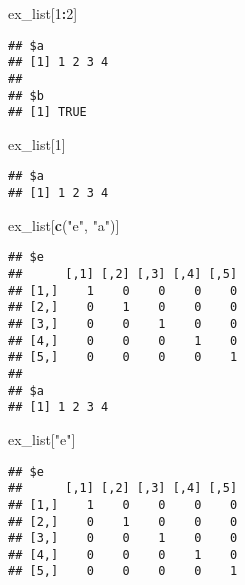 \documentclass[]{book}
\newenvironment{Shaded}{\begin{snugshade}}{\end{snugshade}}
\newcommand{\DecValTok}[1]{\textcolor[rgb]{0.00,0.00,0.81}{#1}}
\newcommand{\KeywordTok}[1]{\textcolor[rgb]{0.13,0.29,0.53}{\textbf{#1}}}
\newcommand{\NormalTok}[1]{#1}
\newcommand{\OperatorTok}[1]{\textcolor[rgb]{0.81,0.36,0.00}{\textbf{#1}}}
\newcommand{\StringTok}[1]{\textcolor[rgb]{0.31,0.60,0.02}{#1}}
\begin{document}
\begin{Shaded}
\begin{Highlighting}[]
\NormalTok{ex_list[}\DecValTok{1}\OperatorTok{:}\DecValTok{2}\NormalTok{]}
\end{Highlighting}
\end{Shaded}

\begin{verbatim}
## $a
## [1] 1 2 3 4
## 
## $b
## [1] TRUE
\end{verbatim}

\begin{Shaded}
\begin{Highlighting}[]
\NormalTok{ex_list[}\DecValTok{1}\NormalTok{]}
\end{Highlighting}
\end{Shaded}

\begin{verbatim}
## $a
## [1] 1 2 3 4
\end{verbatim}

\begin{Shaded}
\begin{Highlighting}[]
\NormalTok{ex_list[}\KeywordTok{c}\NormalTok{(}\StringTok{"e"}\NormalTok{, }\StringTok{"a"}\NormalTok{)]}
\end{Highlighting}
\end{Shaded}

\begin{verbatim}
## $e
##      [,1] [,2] [,3] [,4] [,5]
## [1,]    1    0    0    0    0
## [2,]    0    1    0    0    0
## [3,]    0    0    1    0    0
## [4,]    0    0    0    1    0
## [5,]    0    0    0    0    1
## 
## $a
## [1] 1 2 3 4
\end{verbatim}

\begin{Shaded}
\begin{Highlighting}[]
\NormalTok{ex_list[}\StringTok{"e"}\NormalTok{]}
\end{Highlighting}
\end{Shaded}

\begin{verbatim}
## $e
##      [,1] [,2] [,3] [,4] [,5]
## [1,]    1    0    0    0    0
## [2,]    0    1    0    0    0
## [3,]    0    0    1    0    0
## [4,]    0    0    0    1    0
## [5,]    0    0    0    0    1
\end{verbatim}

\begin{Shaded}
\end{Shaded}
\end{document}

